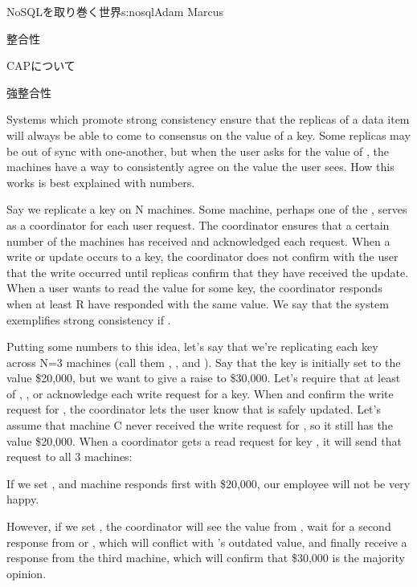 \begin{aosachapter}{NoSQLを取り巻く世界}{s:nosql}{Adam Marcus}
\begin{aosasect1}{整合性}
\begin{aosasect2}{CAPについて}
\end{aosasect2}

\begin{aosasect2}{強整合性}

Systems which promote strong consistency ensure that the replicas of a
data item will always be able to come to consensus on the value of a
key.  Some replicas may be out of sync with one-another, but when the
user asks for the value of , the machines have
a way to consistently agree on the value the user sees.  How this
works is best explained with numbers.

Say we replicate a key on N machines.  Some machine, perhaps one of
the , serves as a coordinator for each user request.  The
coordinator ensures that a certain number of the  machines has
received and acknowledged each request.  When a write or update occurs
to a key, the coordinator does not confirm with the user that the
write occurred until  replicas confirm that they have received
the update.  When a user wants to read the value for some key, the
coordinator responds when at least R have responded with the same
value.  We say that the system exemplifies strong consistency if
.

Putting some numbers to this idea, let's say that we're replicating
each key across N=3 machines (call them , , and
).  Say that the key  is initially set
to the value \$20,000, but we want to give  a raise
to \$30,000.  Let's require that at least  of ,
, or  acknowledge each write request for a key.  When
 and  confirm the write request for , the coordinator lets the user know that
 is safely updated.  Let's assume that machine
C never received the write request for , so it
still has the value \$20,000.  When a coordinator gets a read request
for key , it will send that request to all 3
machines:

\begin{aosaitemize}

  \item If we set , and machine  responds first with
  \$20,000, our employee will not be very happy.

  \item However, if we set , the coordinator will see the
  value from , wait for a second response from  or
  , which will conflict with 's outdated value, and
  finally receive a response from the third machine, which will
  confirm that \$30,000 is the majority opinion.


\end{aosaitemize}
\end{aosasect2}
\end{aosasect1}
\end{aosachapter}
